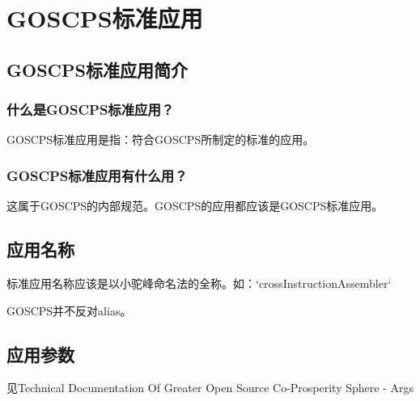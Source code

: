 \chapter{GOSCPS标准应用}

\section{GOSCPS标准应用简介}
\subsection{什么是GOSCPS标准应用？}
GOSCPS标准应用是指：符合GOSCPS所制定的标准的应用。

\subsection{GOSCPS标准应用有什么用？}
这属于GOSCPS的内部规范。GOSCPS的应用都应该是GOSCPS标准应用。


\section{应用名称}
标准应用名称应该是以小驼峰命名法的全称。如：`crossInstructionAssembler`\newline{}

GOSCPS并不反对alias。

\section{应用参数}

见Technical Documentation Of Greater Open Source Co-Prosperity Sphere - Args

